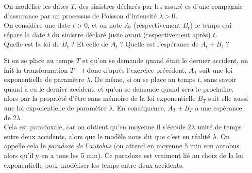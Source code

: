 \documentclass[11pt, answers]{exam}
\begin{document}
\begin{questions}
\question
  On modélise les dates $T_i$ des sinistres déclarés par les assuré-es d'une compagnie d'assurance par un processus de Poisson d'intensité $\lambda>0$.\\
  On considère une date $t>0$, et on note $A_t$ (respectivement $B_t$) le temps qui sépare la date $t$ du sinistre déclaré juste avant (respectivement après) $t$.\\
  Quelle est la loi de $B_t$ ? Et celle de $A_t$ ? Quelle est l'espérance de $A_t+B_t$ ?
  \begin{solution}
	Si on se place au temps $T$ et qu'on se demande quand était le dernier accident, on fait la transformation $T-t$ donc d'après l'exercice précédent, $A_T$ suit une loi exponentielle de paramètre $\lambda$. De même, si on se place au temps $t$, sans savoir quand à eu le dernier accident, et qu'on se demande quand sera le prochaine, alors par la propriété d'être sans mémoire de la loi exponentielle $B_T$ suit elle aussi une loi exponentielle de paramètre $\lambda$. En conséquence, $A_T+B_T$ a une espérance de $2\lambda$.\\
Cela est paradoxale, car on obtient qu'en moyenne il s'écoule $2\lambda$ unité de temps entre deux accidents, alors que le modèle nous dit que c'est en réalité $\lambda$. On appelle cela le \emph{paradoxe de l'autobus} (on attend en moyenne 5 min son autobus alors qu'il y en a tous les 5 min). Ce paradoxe est vraiment lié au choix de la loi exponentielle pour modéliser les temps entre deux accidents.
  \end{solution}

\end{questions}
\end{document}
